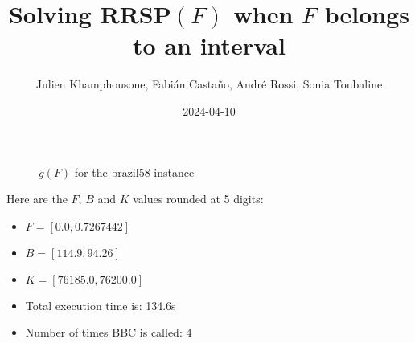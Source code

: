 \documentclass{article}
\begin{document}
     \title{Solving RRSP$(F)$ when $F$ belongs to an interval}
     \author{Julien Khamphousone, Fabi\'an Casta\~no, Andr\'e Rossi, Sonia Toubaline}
     \date{2024-04-10}
     \maketitle
     \def\F{{0.0,0.0072674,0.0079942}}
\def\gF{{761.85,762.6850291,76200.6850291}}
\begin{figure}[ht!]
    \begin{center}
    \end{center}
    \vspace*{-2eM}
    \caption{$g(F)$ for the brazil58 instance}\label{fig:1}
    \end{figure}
    Here are the $F$, $B$ and $K$ values rounded at 5 digits:

\begin{itemize}
	\item  $F = [0.0,0.7267442]$
 \item $B = [114.9,94.26]$
 \item  $K = [76185.0,76200.0]$\item Total execution time is: 134.6s\item Number of times BBC is called: 4\end{itemize}
\end{document}
